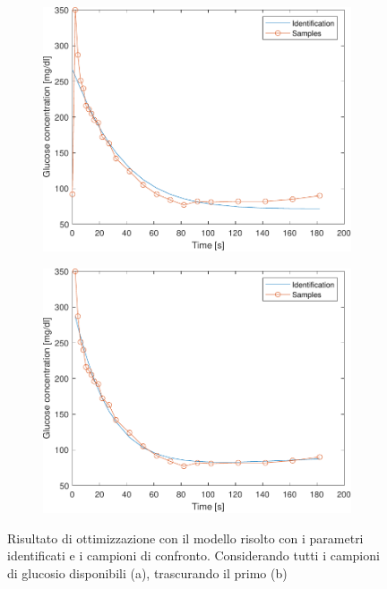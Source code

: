 \begin{figure}[t!]
	\begin{subfigure}{0.5\linewidth}
		\centering
		\includegraphics[width=0.95\linewidth]{../code/identification/optim}
		\caption{}
		\label{fig:optim}
	\end{subfigure}\hfill
	\begin{subfigure}{0.5\linewidth}
		\centering
		\includegraphics[width=0.95\linewidth]{../code/identification/optim1}
		\caption{}
		\label{fig:optim1}
	\end{subfigure}\hfill
	\caption{Risultato di ottimizzazione con il modello risolto con i parametri identificati e i campioni di confronto. Considerando tutti i campioni di glucosio disponibili (a), trascurando il primo (b)}
\end{figure}


